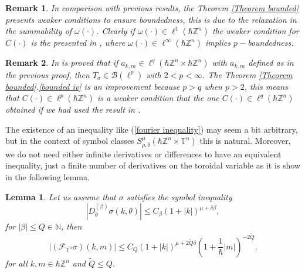 \documentclass[pdflatex,sn-mathphys-num]{sn-jnl}%
\theoremstyle{thmstyleone}%
\newtheorem{lemma}{Lemma}
\theoremstyle{thmstyletwo}%
\newtheorem{remark}{Remark}%
\theoremstyle{thmstylethree}%
\begin{document}
\begin{remark}\label{remark theorem bounded}
      In comparison with previous results, the Theorem \ref{Theorem bounded} presents weaker conditions to ensure boundedness, this is due to the relaxation in the summability of $\omega(\cdot)$. Clearly if $\omega(\cdot)\in\ell^1(\hbar\mathbb{Z}^n)$  the weaker condition for $C(\cdot)$ is the presented in \cite{molahajloo2010pseudo}, where $\omega(\cdot)\in\ell^\infty(\hbar\mathbb{Z}^n)$ implies $p-$boundedness.\\

\end{remark}
\begin{remark}
    In \cite{carlos2011p} is proved that if $a_{k,m}\in \ell^q(\hbar\mathbb{Z}^n\times\hbar\mathbb{Z}^n) $ with $a_{k,m}$ defined as in the previous proof, then  $T_\sigma\in\mathcal{B}(\ell^p)$ with $2< p<\infty$. The Theorem \ref{Theorem bounded}.\ref{bounded iv} is an improvement because $p>q$ when $p>2$, this means that $C(\cdot)\in\ell^p(\hbar\mathbb{Z}^n)$ is a weaker condition that the one $C(\cdot)\in\ell^q(\hbar\mathbb{Z}^n)$ obtained if we had used the result in \cite[Corollary 3.1]{carlos2011p}.
\end{remark}
The existence of an inequality like (\ref{fourier inequality}) may seem a bit arbitrary, but in the context of symbol classes $S^\mu_{\rho,\delta}(\hbar\mathbb{Z}^n\times\mathbb{T}^n)$ this is natural. Moreover, we do not need either infinite derivatives or differences to have an equivalent inequality, just a finite number of derivatives on the toroidal variable as it is show in the following  lemma.
\begin{lemma}\label{fourier bound}
    Let us assume that $\sigma$ satisfies the symbol inequality 
\begin{equation*}
|D_\theta^{(\beta)}\sigma(k,\theta)|\leq C_{\beta} (1+|k|)^{\mu+\delta\beta }, 
\end{equation*}
for $|\beta|\leq Q\in\mathbb{N}$, then 
\[|(\mathcal{F}_{\mathbb{T}^n}\sigma)(k,m)|\leq C_Q (1+|k|)^{\mu+2\tilde{Q}\delta} \left(1+\frac{1}{\hbar}|m|\right)^{-2\tilde{Q}}. \]
for all $k,m\in\hbar\mathbb{Z}^n$ and $\tilde{Q}\leq Q$.
\end{lemma}
\end{document}
